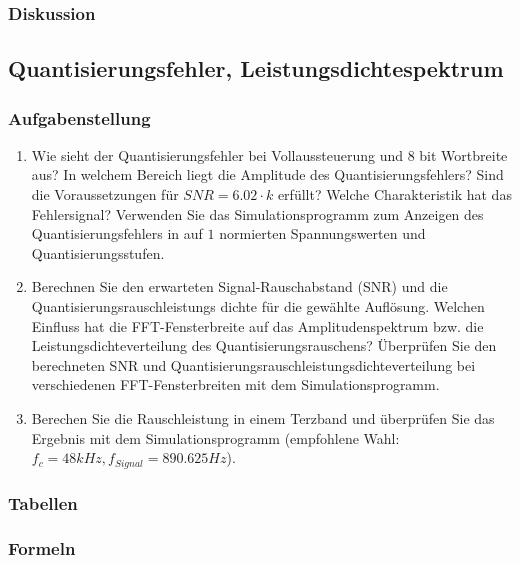 \subsubsection{Diskussion}
\pagebreak

%
%

\subsection{Quantisierungsfehler, Leistungsdichtespektrum}
\subsubsection{Aufgabenstellung}
\begin{enumerate}
\item Wie sieht der Quantisierungsfehler bei Vollaussteuerung und $8$ bit Wortbreite aus? In welchem Bereich liegt die Amplitude des Quantisierungsfehlers? Sind die Voraussetzungen für $SNR = 6.02 \cdot k$ erfüllt? Welche Charakteristik hat das Fehlersignal? Verwenden Sie das Simulationsprogramm zum Anzeigen des Quantisierungsfehlers in auf $1$ normierten Spannungswerten und Quantisierungsstufen. 
\item Berechnen Sie den erwarteten Signal-Rauschabstand (SNR) und die Quantisierungsrauschleistungs dichte für die gewählte Auflösung. Welchen Einfluss hat die FFT-Fensterbreite auf das Amplitudenspektrum bzw. die Leistungsdichteverteilung des Quantisierungsrauschens?
Überprüfen Sie den berechneten SNR und Quantisierungsrauschleistungsdichteverteilung bei verschiedenen FFT-Fensterbreiten mit dem Simulationsprogramm. 
\item Berechen Sie die Rauschleistung in einem Terzband und überprüfen Sie das Ergebnis mit dem Simulationsprogramm (empfohlene Wahl: $f_c = 48kHz, f_{Signal} = 890.625Hz$). 
\end{enumerate}



\subsubsection{Tabellen}

\subsubsection{Formeln}

